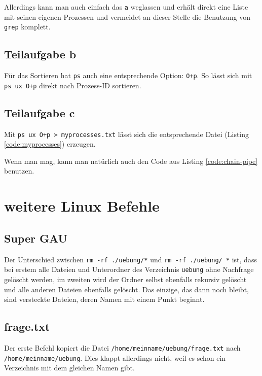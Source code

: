 {Allerdings kann man auch einfach das \texttt{a} weglassen und erhält direkt eine Liste mit seinen eigenen Prozessen und vermeidet an dieser Stelle die Benutzung von \texttt{grep} komplett.


\subsection{Teilaufgabe b}
Für das Sortieren hat \texttt{ps} auch eine entsprechende Option: \texttt{O+p}. So lässt sich mit \texttt{ps ux O+p} direkt nach Prozess-ID sortieren.

\subsection{Teilaufgabe c}
Mit \verb#ps ux O+p > myprocesses.txt# lässt sich die entsprechende Datei (Listing \ref{code:myprocesses}) erzeugen.



Wenn man mag, kann man natürlich auch den Code aus Listing \ref{code:chain-pipe} benutzen.


\section{weitere Linux Befehle}

\subsection{Super GAU}

Der Unterschied zwischen \verb#rm -rf ./uebung/*# und \verb#rm -rf ./uebung/ *# ist, dass bei erstem alle Dateien und Unterordner des Verzeichnis \texttt{uebung} ohne Nachfrage gelöscht werden, im zweiten wird der Ordner selbst ebenfalls rekursiv gelöscht und alle anderen Dateien ebenfalls gelöscht. Das einzige, das dann noch bleibt, sind versteckte Dateien, deren Namen mit einem Punkt beginnt.

\subsection{frage.txt}

Der erste Befehl kopiert die Datei \texttt{/home/meinname/uebung/frage.txt} nach \texttt{/home/meinname/uebung}. Dies klappt allerdings nicht, weil es schon ein Verzeichnis mit dem gleichen Namen gibt.

}
